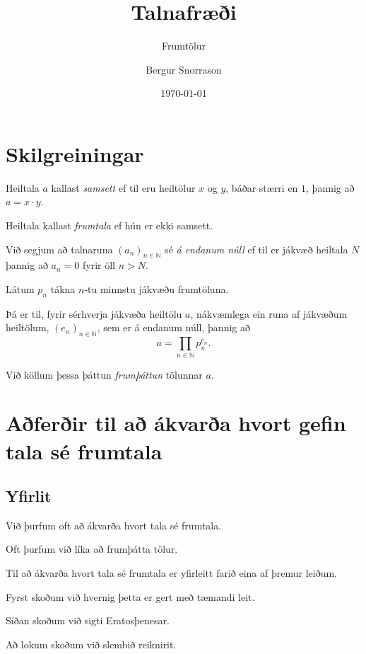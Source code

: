 \title{Talnafræði}
\subtitle{Frumtölur}
\author{Bergur Snorrason}
\date{\today}



\frame{\titlepage}

\section{Skilgreiningar}
{
    {
        \item<1-> Heiltala $a$ kallast \emph{samsett} ef til eru heiltölur $x$ og $y$, báðar stærri en $1$, þannig að $a = x \cdot y$.
        \item<2-> Heiltala kallast \emph{frumtala} ef hún er ekki samsett.
        \item<3-> Við segjum að talnaruna $(a_n)_{n \in \mathbb{N}}$ sé \emph{á endanum núll} ef til er jákvæð heiltala $N$ þannig að
            $a_n = 0$ fyrir öll $n > N$.
        \item<4-> Látum $p_n$ tákna $n$-tu minnstu jákvæðu frumtöluna.
        \item<5-> Þá er til, fyrir sérhverja jákvæða heiltölu $a$, nákvæmlega ein runa af jákvæðum heiltölum, $(e_n)_{n \in \mathbb{N}}$,
            sem er á endanum núll, þannig að
        \[
            a = \prod_{n \in \mathbb{N}} p_n^{e_n}.
        \]
        \item<6-> Við köllum þessa þáttun \emph{frumþáttun} tölunnar $a$.
    }
}

\section{Aðferðir til að ákvarða hvort gefin tala sé frumtala}
\subsection{Yfirlit}
{
    {
        \item<1-> Við þurfum oft að ákvarða hvort tala sé frumtala.
        \item<2-> Oft þurfum við líka að frumþátta tölur.
        \item<3-> Til að ákvarða hvort tala sé frumtala er yfirleitt farið eina af þremur leiðum.
        \item<4-> Fyrst skoðum við hvernig þetta er gert með tæmandi leit.
        \item<5-> Síðan skoðum við sigti Eratosþenesar.
        \item<6-> Að lokum skoðum við slembið reiknirit.
    }
}

